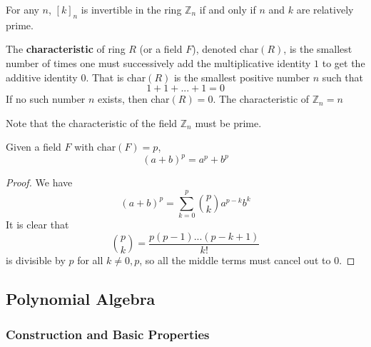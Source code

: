 \documentclass{article}
\begin{document}
    \begin{corollary}
      For any $n$, $[k]_n$ is invertible in the ring $\mathbb{Z}_n$ if and only if $n$ and $k$ are relatively prime. 
    \end{corollary}

    \begin{definition}
      The \textbf{characteristic} of ring $R$ (or a field $F$), denoted char$(R)$, is the smallest number of times one must successively add the multiplicative identity $1$ to get the additive identity $0$. That is char$(R)$ is the smallest positive number $n$ such that 
      \begin{equation}
        1 + 1 + ... + 1 = 0 
      \end{equation}
      If no such number $n$ exists, then char$(R) = 0$. The characteristic of $\mathbb{Z}_n = n$
    \end{definition}

    Note that the characteristic of the field $\mathbb{Z}_n$ must be prime. 

    \begin{theorem}
      Given a field $F$ with char$(F) = p$, 
      \begin{equation}
        (a + b)^p = a^p + b^p
      \end{equation}
    \end{theorem}
    \begin{proof}
      We have 
      \begin{equation}
        (a + b)^p = \sum_{k = 0}^p \binom{p}{k} a^{p-k} b^{k}
      \end{equation}
      It is clear that 
      \begin{equation}
        \binom{p}{k} = \frac{p (p-1) ... (p - k+1)}{k!}
      \end{equation}
      is divisible by $p$ for all $k \neq 0, p$, so all the middle terms must cancel out to $0$. 
    \end{proof}

  \subsection{Polynomial Algebra}

    \subsubsection{Construction and Basic Properties}
\end{document}
